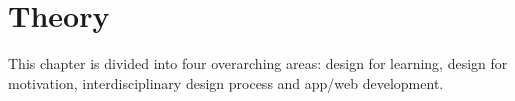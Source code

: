 \chapter{Theory}\label{cha:Theory}
%

This chapter is divided into four overarching areas: design for learning, design for motivation, interdisciplinary design process and app/web development.








